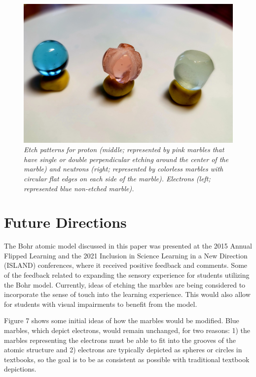 \documentclass[11pt]{sig-alternate}
\begin{document}
\begin{large}
\begin{figure}[h]
    \centering
    \includegraphics[width=\columnwidth]{figure 7.png}
    \captionsetup{font=large, labelfont=it}
    \caption{\textit{Etch patterns for proton (middle; represented by pink marbles that have single or double perpendicular etching around the center of the marble) and neutrons (right; represented by colorless marbles with circular flat edges on each side of the marble). Electrons (left; represented blue non-etched marble).}}
    \label{Figure 7}
\end{figure}
\section*{Future Directions}
The Bohr atomic model discussed in this paper was presented at the 2015 Annual Flipped Learning and the 2021 Inclusion in Science Learning in a New Direction (ISLAND) conferences, where it received positive feedback and comments. Some of the feedback related to expanding the sensory experience for students utilizing the Bohr model. Currently, ideas of etching the marbles are being considered to incorporate the sense of touch into the learning experience. This would also allow for students with visual impairments to benefit from the model. 

Figure 7 shows some initial ideas of how the marbles would be modified. Blue marbles, which depict electrons, would remain unchanged, for two reasons: 1) the marbles representing the electrons must be able to fit into the grooves of the atomic structure and 2) electrons are typically depicted as spheres or circles in textbooks, so the goal is to be as consistent as possible with traditional textbook depictions.


\end{large}
\end{document}

